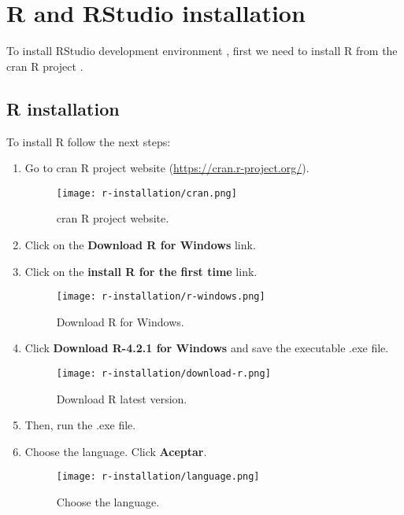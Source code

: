 \chapter{R and RStudio installation}
\label{cha:r-installation}

To install RStudio development environment \cite{rstudio}, first we need to install R from the \acrfull{cran} R project \cite{r-project}.

\section{R installation}

To install R follow the next steps:

\begin{enumerate}
    \item Go to \acrshort{cran} R project website (\url{https://cran.r-project.org/}).
        \begin{figure}[H]
            \centering
            \texttt{[image: r-installation/cran.png]}
            \caption{\acrshort{cran} R project website.}
            \label{fig:cran}
        \end{figure}
    
    \item Click on the \textbf{Download R for Windows} link.
    
    \item Click on the \textbf{install R for the first time} link.
        \begin{figure}[H]
            \centering
            \texttt{[image: r-installation/r-windows.png]}
            \caption{Download R for Windows.}
            \label{fig:r-windows}
        \end{figure}
    
    \item Click \textbf{Download R-4.2.1 for Windows} and save the executable .exe file.
        \begin{figure}[H]
            \centering
            \texttt{[image: r-installation/download-r.png]}
            \caption{Download R latest version.}
            \label{fig:download-r}
        \end{figure}
    
    \item Then, run the .exe file.
    
    \item Choose the language. Click \textbf{Aceptar}.
        \begin{figure}[H]
            \centering
            \texttt{[image: r-installation/language.png]}
            \caption{Choose the language.}
            \label{fig:language}
        \end{figure}
        

\end{enumerate}
